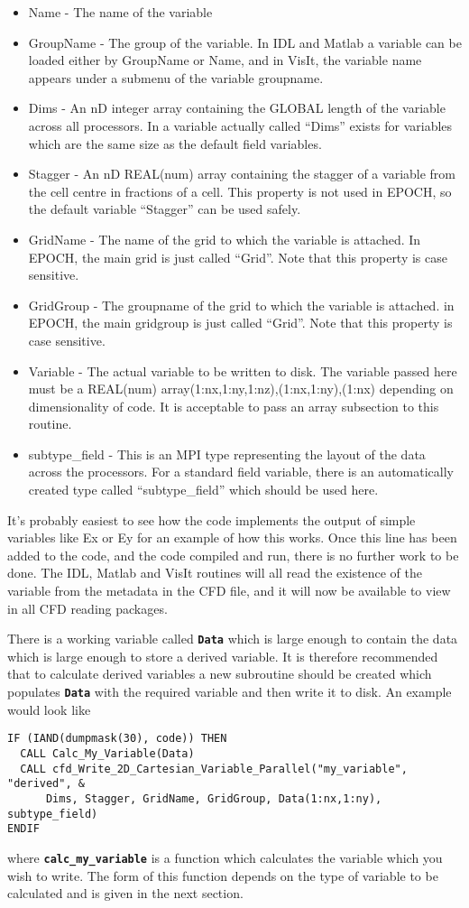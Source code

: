 \documentclass[12pt,a4paper]{article}
\newcommand{\simpleboxverbatim}{\begin{Verbatim}[obeytabs=true,frame=single,
  framerule=0.5mm,rulecolor=\color{warwickmid},formatcom=\color{black}]}
\newcommand{\inlinecode}[1]{{\color{warwickred} \bf\texttt{#1}}}
\newcommand{\EPOCH}{{\color{warwickdark}\fontfamily{phv}\selectfont{EPOCH}}}
\begin{document}
\begin{itemize}
\item Name - The name of the variable
\item GroupName - The group of the variable. In IDL and Matlab a variable can
  be loaded either by GroupName or Name, and in VisIt, the variable name
  appears under a submenu of the variable groupname.
\item Dims - An nD integer array containing the GLOBAL length of the variable
  across all processors. In {\EPOCH} a variable actually called ``Dims'' exists
  for variables which are the same size as the default field variables.
\item Stagger - An nD REAL(num) array containing the stagger of a variable from
  the cell centre in fractions of a cell. This property is not used in EPOCH,
  so the default variable ``Stagger'' can be used safely.
\item GridName - The name of the grid to which the variable is attached. In
  EPOCH, the main grid is just called ``Grid''. Note that this property is case
  sensitive.
\item GridGroup - The groupname of the grid to which the variable is
  attached. in EPOCH, the main gridgroup is just called ``Grid''. Note that
  this property is case sensitive.
\item Variable - The actual variable to be written to disk. The variable passed
  here must be a REAL(num) array(1:nx,1:ny,1:nz),(1:nx,1:ny),(1:nx) depending
  on dimensionality of code. It is acceptable to pass an array subsection to
  this routine.
\item subtype\_field - This is an MPI type representing the layout of the data
  across the processors. For a standard field variable, there is an
  automatically created type called ``subtype\_field'' which should be used
  here.
\end{itemize}

It's probably easiest to see how the code implements the output of simple
variables like Ex or Ey for an example of how this works. Once this line has
been added to the code, and the code compiled and run, there is no further work
to be done. The IDL, Matlab and VisIt routines will all read the existence of
the variable from the metadata in the CFD file, and it will now be available to
view in all CFD reading packages.

There is a working variable called \inlinecode{Data} which is large enough to
contain the data which is large enough to store a derived variable. It is
therefore recommended that to calculate derived variables a new subroutine
should be created which populates \inlinecode{Data} with the required variable
and then write it to disk. An example would look like
\simpleboxverbatim
IF (IAND(dumpmask(30), code)) THEN
  CALL Calc_My_Variable(Data)
  CALL cfd_Write_2D_Cartesian_Variable_Parallel("my_variable", "derived", &
      Dims, Stagger, GridName, GridGroup, Data(1:nx,1:ny), subtype_field)
ENDIF
\end{Verbatim}
where \inlinecode{calc\_my\_variable} is a function which calculates the
variable which you wish to write. The form of this function depends on the type
of variable to be calculated and is given in the next section.
\end{document}
